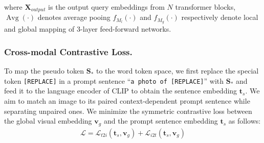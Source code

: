 \documentclass[letterpaper]{article} \usepackage{aaai24}  \usepackage{times}  \usepackage{helvet}  \usepackage{courier}  \usepackage[hyphens]{url}  \usepackage{graphicx} \urlstyle{rm} \def\UrlFont{\rm}  \usepackage{natbib}  \usepackage{caption} \frenchspacing  \setlength{\pdfpagewidth}{8.5in} \setlength{\pdfpageheight}{11in} \usepackage{algorithm}
\begin{document}
\iffalse
\begin{gather}
\operatorname{Attention}(\mathbf{Q}, \mathbf{K}, \mathbf{V})=\operatorname{softmax}\left(\frac{\mathbf{Q K}^{\top}}{\sqrt{d}}\right)\mathbf{V} \\
\tilde{\boldsymbol{x}}_{q_{i}} = \tilde{\boldsymbol{x}}_{q_{i-1}} + \operatorname{Attention}(\mathbf{Q}, \mathbf{K}, \mathbf{V}) \\
\tilde{\boldsymbol{x}}_{q_{i}} = \tilde{\boldsymbol{x}}_{q_{i-1}} + \operatorname{FFW}(\tilde{\boldsymbol{x}}_{q_i})
\label{f:attn}
\end{gather}
\fi

\iffalse
\begin{gather}
gate=\tanh\left(f_{M_l}(\operatorname{Avg}(\tilde{\boldsymbol{X}}_{ouput}))+f_{M_g}(\tilde{\boldsymbol{v}}_{g})\right) \\
\boldsymbol{p} = f_{M_l}(\operatorname{avg}(\tilde{\boldsymbol{x}}_p))\times{gate} + f_{M_g}(\tilde{\boldsymbol{v}}_{g})
\label{f:gate}
\end{gather}
\fi
\noindent where $\boldsymbol{X}_{output}$ is the output query embeddings from $N$ transformer blocks, $\operatorname{Avg}(\cdot)$ denotes average pooing $f_{M_l}(\cdot)$ and $f_{M_g}(\cdot)$ respectively denote local and global mapping of 3-layer feed-forward networks. 


\subsubsection{Cross-modal Contrastive Loss.} 
To map the pseudo token $\boldsymbol{S}_{*}$ to the word token space,  we first replace the special token \texttt{[REPLACE]} in a prompt sentence ``\texttt{a photo of [REPLACE]}'' with $\boldsymbol{S}_{*}$ and feed it to the language encoder of CLIP to obtain the sentence embedding $\boldsymbol{t}_s$. We aim to match an image to its paired context-dependent prompt sentence while separating unpaired
ones. We minimize the symmetric contrastive loss between the global visual embedding $\boldsymbol{v}_g$ and the prompt sentence embedding $\boldsymbol{t}_s$ as follows:
\begin{equation}
\begin{aligned}
\mathcal{L}=\mathcal{L}_{t 2 i}(\boldsymbol{t}_s,\boldsymbol{v}_g)+\mathcal{L}_{i 2 t}(\boldsymbol{t}_s, \boldsymbol{v}_g)
\end{aligned}
\label{f:loss}
\end{equation}
\end{document}
